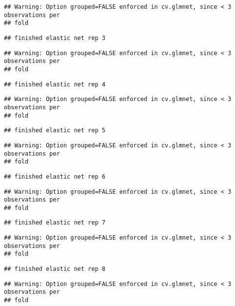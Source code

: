 \documentclass[]{article}
\begin{document}
\begin{verbatim}
## Warning: Option grouped=FALSE enforced in cv.glmnet, since < 3 observations per
## fold
\end{verbatim}

\begin{verbatim}
## finished elastic net rep 3
\end{verbatim}

\begin{verbatim}
## Warning: Option grouped=FALSE enforced in cv.glmnet, since < 3 observations per
## fold
\end{verbatim}

\begin{verbatim}
## finished elastic net rep 4
\end{verbatim}

\begin{verbatim}
## Warning: Option grouped=FALSE enforced in cv.glmnet, since < 3 observations per
## fold
\end{verbatim}

\begin{verbatim}
## finished elastic net rep 5
\end{verbatim}

\begin{verbatim}
## Warning: Option grouped=FALSE enforced in cv.glmnet, since < 3 observations per
## fold
\end{verbatim}

\begin{verbatim}
## finished elastic net rep 6
\end{verbatim}

\begin{verbatim}
## Warning: Option grouped=FALSE enforced in cv.glmnet, since < 3 observations per
## fold
\end{verbatim}

\begin{verbatim}
## finished elastic net rep 7
\end{verbatim}

\begin{verbatim}
## Warning: Option grouped=FALSE enforced in cv.glmnet, since < 3 observations per
## fold
\end{verbatim}

\begin{verbatim}
## finished elastic net rep 8
\end{verbatim}

\begin{verbatim}
## Warning: Option grouped=FALSE enforced in cv.glmnet, since < 3 observations per
## fold
\end{verbatim}
\end{document}
